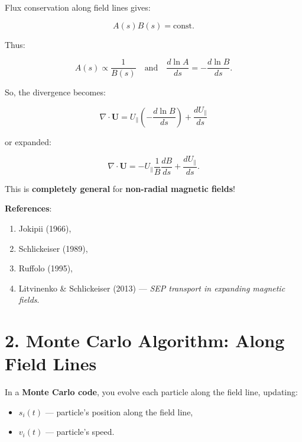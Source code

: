 Flux conservation along field lines gives:

\begin{equation}
A(s) B(s) = \text{const}.
\tag{4}
\end{equation}

Thus:

\begin{equation}
A(s) \propto \frac{1}{B(s)}
\quad \text{and} \quad
\frac{d \ln A}{ds} = -\frac{d \ln B}{ds}.
\tag{5}
\end{equation}

So, the divergence becomes:

\begin{equation}
\boxed{
\nabla \cdot \mathbf{U} = U_\parallel \left( -\frac{d \ln B}{ds} \right) + \frac{d U_\parallel}{ds}
}
\tag{6}
\end{equation}

or expanded:

\begin{equation}
\nabla \cdot \mathbf{U} = -U_\parallel \frac{1}{B} \frac{dB}{ds} + \frac{d U_\parallel}{ds}.
\end{equation}

This is \textbf{completely general} for \textbf{non-radial magnetic fields}!

\medskip

\noindent
\textbf{References}:
\begin{enumerate}
    \item Jokipii (1966),
    \item Schlickeiser (1989),
    \item Ruffolo (1995),
    \item Litvinenko \& Schlickeiser (2013) — \textit{SEP transport in expanding magnetic fields}.
\end{enumerate}

\hrulefill

\section*{\texorpdfstring{ \textbf{2. Monte Carlo Algorithm: Along Field Lines}}{}}

In a \textbf{Monte Carlo code}, you evolve each particle along the field line, updating:
\begin{itemize}
    \item $s_i(t)$ — particle’s position along the field line,
    \item $v_i(t)$ — particle’s speed.
\end{itemize}

